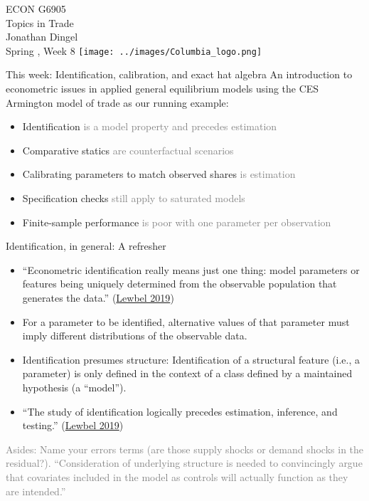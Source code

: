 \documentclass[11pt,notes=hide,aspectratio=169]{beamer}
\begin{document}
\begin{frame}[plain]
\begin{center}
\large
\textcolor{columbiadarkblue}{ECON G6905\\
Topics in Trade\\ 
Jonathan Dingel\\
Spring \the\year, Week 8}
\vfill 
\texttt{[image: ../images/Columbia\_logo.png]}
\end{center}
\end{frame}
\begin{frame}{This week: Identification, calibration, and exact hat algebra}
An introduction to econometric issues in applied general equilibrium models
using the CES Armington model of trade as our running example:
\begin{itemize}
\item Identification \textcolor{gray}{is a model property and precedes estimation}
\item Comparative statics \textcolor{gray}{are counterfactual scenarios}
\item Calibrating parameters to match observed shares \textcolor{gray}{is estimation}
\item Specification checks \textcolor{gray}{still apply to saturated models}
\item Finite-sample performance \textcolor{gray}{is poor with one parameter per observation}
\end{itemize}
\end{frame}
\begin{frame}{Identification, in general: A refresher}
\begin{itemize}
\item ``Econometric identification really means just one thing: model parameters or features being uniquely determined from the observable population that generates the data.'' (\href{https://www.aeaweb.org/articles?id=10.1257/jel.20181361}{Lewbel 2019})
\item For a parameter to be identified, alternative values of that parameter must imply different distributions of the observable data.
\item Identification presumes structure: Identification of a structural feature (i.e., a parameter) is only defined in the context of a class defined by a maintained hypothesis (a ``model'').
\item ``The study of identification logically precedes estimation, inference, and testing.'' (\href{https://www.aeaweb.org/articles?id=10.1257/jel.20181361}{Lewbel 2019}) 
\end{itemize}
{\footnotesize \textcolor{gray}{Asides: Name your errors terms (are those supply shocks or demand shocks in the residual?). ``Consideration of underlying structure is needed to convincingly argue that covariates included in the model as controls will actually function as they are intended.''}\par}
\end{frame}
\end{document}
